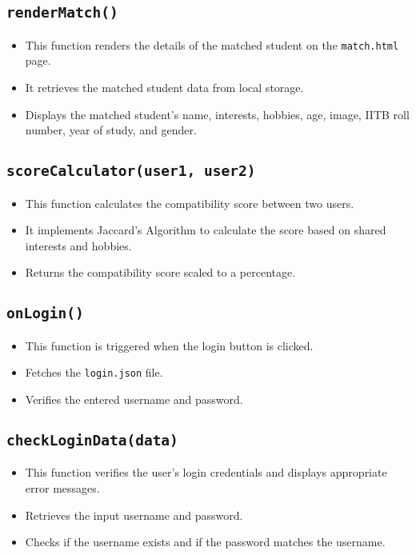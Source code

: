 \documentclass[12pt,a4paper]{article}
\begin{document}
\subsection{\texttt{renderMatch()}}
\begin{itemize}
    \item This function renders the details of the matched student on the \texttt{match.html} page.
    \item It retrieves the matched student data from local storage.
    \item Displays the matched student's name, interests, hobbies, age, image, IITB roll number, year of study, and gender.
\end{itemize}

\subsection{\texttt{scoreCalculator(user1, user2)}}
\begin{itemize}
    \item This function calculates the compatibility score between two users.
    \item It implements Jaccard's Algorithm to calculate the score based on shared interests and hobbies.
    \item Returns the compatibility score scaled to a percentage.
\end{itemize}

\subsection{\texttt{onLogin()}}
\begin{itemize}
    \item This function is triggered when the login button is clicked.
    \item Fetches the \texttt{login.json} file.
    \item Verifies the entered username and password.
\end{itemize}

\subsection{\texttt{checkLoginData(data)}}
\begin{itemize}
    \item This function verifies the user's login credentials and displays appropriate error messages.
    \item Retrieves the input username and password.
    \item Checks if the username exists and if the password matches the username.
\end{itemize}
\end{document}
